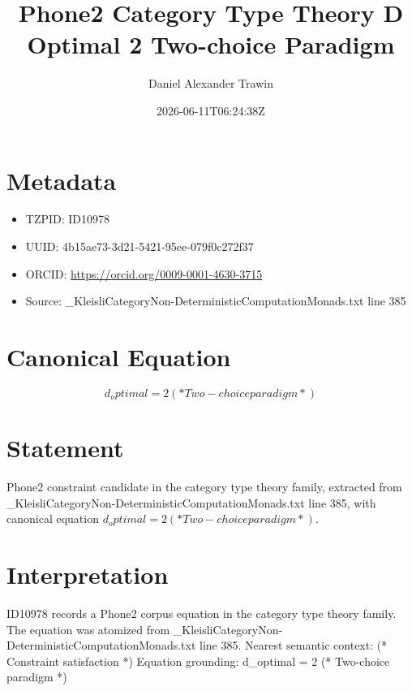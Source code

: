 \documentclass[11pt]{article}
\title{Phone2 Category Type Theory D Optimal 2 Two-choice Paradigm}
\author{Daniel Alexander Trawin}
\date{2026-06-11T06:24:38Z}
\begin{document}
\maketitle
\section*{Metadata}
\begin{itemize}
\item TZPID: ID10978
\item UUID: 4b15ae73-3d21-5421-95ee-079f0c272f37
\item ORCID: \url{https://orcid.org/0009-0001-4630-3715}
\item Source: _KleisliCategoryNon-DeterministicComputationMonads.txt line 385
\end{itemize}
\section*{Canonical Equation}
\[
d_optimal = 2 (* Two-choice paradigm *)
\]
\section*{Statement}
Phone2 constraint candidate in the category type theory family, extracted from _KleisliCategoryNon-DeterministicComputationMonads.txt line 385, with canonical equation $d_optimal = 2 (* Two-choice paradigm *)$.
\section*{Interpretation}
ID10978 records a Phone2 corpus equation in the category type theory family. The equation was atomized from _KleisliCategoryNon-DeterministicComputationMonads.txt line 385. Nearest semantic context: (* Constraint satisfaction *) Equation grounding: d_optimal = 2 (* Two-choice paradigm *)
\end{document}
